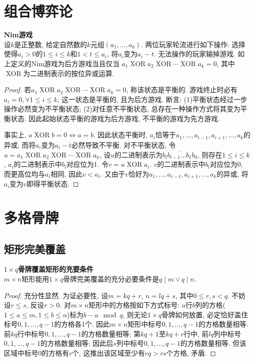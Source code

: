 
\section{组合博弈论}

\begin{pro}\textbf{Nim游戏}\\
设$k$是正整数, 给定自然数的$k$元组$(a_1,\dots, a_k)$. 两位玩家轮流进行如下操作: 选择使得$a_i>0$的$1\le i\le k$和$1<t\le a_i$, 将$a_i$变为$a_i-t$. 无法操作的玩家输掉游戏. 如上定义的Nim游戏为后方游戏当且仅当 $a_1 \operatorname{XOR} a_2 \operatorname{XOR} \cdots \operatorname{XOR} a_k=0$, 其中$\operatorname{XOR}$为二进制表示的按位异或运算. 
\end{pro}
\begin{proof}
若$a_1 \operatorname{XOR} a_2 \operatorname{XOR} \cdots \operatorname{XOR} a_k=0$, 称该状态是平衡的. 游戏终止时必有$a_i=0, \forall 1\le i\le k$, 这一状态是平衡的, 且为后方游戏. 断言: (1)平衡状态经过一步操作必然变为不平衡状态; (2)对任意不平衡状态, 总存在一种操作方式将其变为平衡状态. 因此起始状态平衡的游戏为后方游戏, 不平衡的游戏为先方游戏.
\par 事实上, $a \operatorname{XOR} b=0 \iff a=b$. 因此状态平衡时, $a_i$恰等于$a_1,\dots,a_{i-1},a_{i+1},\dots,a_k$的异或, 而将$a_i$变为$a_i-t$必然导致不平衡. 对不平衡状态, 令$u=a_1 \operatorname{XOR} a_2 \operatorname{XOR} \cdots \operatorname{XOR} a_k$, 设$u$的二进制表示为$\overline{b_lb_{l-1}\dots b_1b_0}$, 则存在$1\le i\le k$, $a_i$的二进制表示中$b_l$对应位为1. 令$v=u \operatorname{XOR} a_i$. $v$的二进制表示中$b_l$对应位为0, 而更高位均与$a_i$相同, 因此$v<a_i$. 又由于$v$恰好为$a_1,\dots,a_{i-1},a_{i+1},\dots,a_k$的异或, 将$a_i$变为$v$即得平衡状态.  


\end{proof}

\section{多格骨牌}

\subsection{矩形完美覆盖}

\begin{pro}\textbf{$1\times q$骨牌覆盖矩形的充要条件}\\
$m\times n$矩形能用$1\times q$骨牌完美覆盖的充分必要条件是$q\mid m \lor q\mid n$. 
\end{pro}
\begin{proof}
充分性显然. 为证必要性, 设$m=kq+r$, $n=lq+s$, 其中$0\le r,s < q$. 不妨设$r\le s$, 反设$r>0$. 对$m\times n$矩形中的方格按如下方式标号: $a$行$b$列的方格($1\le a\le m, 1\le b \le n$)标为$b-a \mod q$, 则无论$1\times q$骨牌如何放置, 必定恰好盖住标号$0,1,\dots,q-1$的方格各1个. 因此$m\times n$矩形中标号$0,1,\dots,q-1$的方格数量相等. 前$kq$行中标号$0,1,\dots,q-1$的方格数量相等; 第$kq+1$至$kq+r$行中, 前$lq$列中标号$0,1,\dots,q-1$的方格数量相等; 因此后$s$列中标号$0,1,\dots,q-1$的方格数量相等. 但该区域中标号0的方格有$r$个, 这推出该区域至少有$rq>rs$个方格, 矛盾.  
\end{proof}

